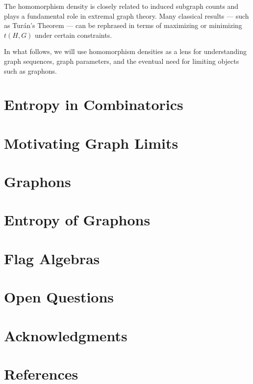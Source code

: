 \documentclass[11pt]{article}
\begin{document}
The homomorphism density is closely related to induced subgraph counts and plays a fundamental role in extremal graph theory. Many classical results — such as Turán’s Theorem — can be rephrased in terms of maximizing or minimizing \( t(H, G) \) under certain constraints.

In what follows, we will use homomorphism densities as a lens for understanding graph sequences, graph parameters, and the eventual need for limiting objects such as graphons.

\section{Entropy in Combinatorics}

\section{Motivating Graph Limits}

\section{Graphons}

\section{Entropy of Graphons}

\section{Flag Algebras}

\section{Open Questions}

\section*{Acknowledgments}

\section*{References}
\end{document}
